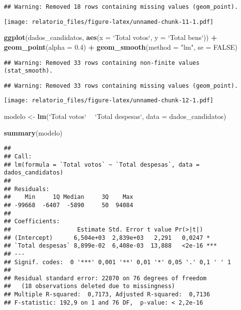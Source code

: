 \documentclass[]{article}
\newenvironment{Shaded}{\begin{snugshade}}{\end{snugshade}}
\newcommand{\KeywordTok}[1]{\textcolor[rgb]{0.13,0.29,0.53}{\textbf{#1}}}
\newcommand{\DataTypeTok}[1]{\textcolor[rgb]{0.13,0.29,0.53}{#1}}
\newcommand{\FloatTok}[1]{\textcolor[rgb]{0.00,0.00,0.81}{#1}}
\newcommand{\StringTok}[1]{\textcolor[rgb]{0.31,0.60,0.02}{#1}}
\newcommand{\OtherTok}[1]{\textcolor[rgb]{0.56,0.35,0.01}{#1}}
\newcommand{\OperatorTok}[1]{\textcolor[rgb]{0.81,0.36,0.00}{\textbf{#1}}}
\newcommand{\NormalTok}[1]{#1}
\begin{document}
\begin{verbatim}
## Warning: Removed 18 rows containing missing values (geom_point).
\end{verbatim}

\texttt{[image: relatorio\_files/figure-latex/unnamed-chunk-11-1.pdf]}

\begin{Shaded}
\begin{Highlighting}[]
\KeywordTok{ggplot}\NormalTok{(dados_candidatos, }\KeywordTok{aes}\NormalTok{(}\DataTypeTok{x =} \StringTok{`}\DataTypeTok{Total votos}\StringTok{`}\NormalTok{, }\DataTypeTok{y =} \StringTok{`}\DataTypeTok{Total bens}\StringTok{`}\NormalTok{)) }\OperatorTok{+}\StringTok{ }
\StringTok{  }\KeywordTok{geom_point}\NormalTok{(}\DataTypeTok{alpha =} \FloatTok{0.4}\NormalTok{) }\OperatorTok{+}\StringTok{ }\KeywordTok{geom_smooth}\NormalTok{(}\DataTypeTok{method =} \StringTok{"lm"}\NormalTok{, }\DataTypeTok{se =} \OtherTok{FALSE}\NormalTok{)}
\end{Highlighting}
\end{Shaded}

\begin{verbatim}
## Warning: Removed 33 rows containing non-finite values (stat_smooth).
\end{verbatim}

\begin{verbatim}
## Warning: Removed 33 rows containing missing values (geom_point).
\end{verbatim}

\texttt{[image: relatorio\_files/figure-latex/unnamed-chunk-12-1.pdf]}

\begin{Shaded}
\begin{Highlighting}[]
\NormalTok{modelo <-}\StringTok{ }\KeywordTok{lm}\NormalTok{(}\StringTok{`}\DataTypeTok{Total votos}\StringTok{`} \OperatorTok{~}\StringTok{ `}\DataTypeTok{Total despesas}\StringTok{`}\NormalTok{, }\DataTypeTok{data =}\NormalTok{ dados_candidatos)}
  
  \KeywordTok{summary}\NormalTok{(modelo)}
\end{Highlighting}
\end{Shaded}

\begin{verbatim}
## 
## Call:
## lm(formula = `Total votos` ~ `Total despesas`, data = dados_candidatos)
## 
## Residuals:
##    Min     1Q Median     3Q    Max 
## -99668  -6407  -5890     50  94084 
## 
## Coefficients:
##                   Estimate Std. Error t value Pr(>|t|)    
## (Intercept)      6,504e+03  2,839e+03   2,291   0,0247 *  
## `Total despesas` 8,899e-02  6,408e-03  13,888   <2e-16 ***
## ---
## Signif. codes:  0 '***' 0,001 '**' 0,01 '*' 0,05 '.' 0,1 ' ' 1
## 
## Residual standard error: 22870 on 76 degrees of freedom
##   (18 observations deleted due to missingness)
## Multiple R-squared:  0,7173, Adjusted R-squared:  0,7136 
## F-statistic: 192,9 on 1 and 76 DF,  p-value: < 2,2e-16
\end{verbatim}
\end{document}
